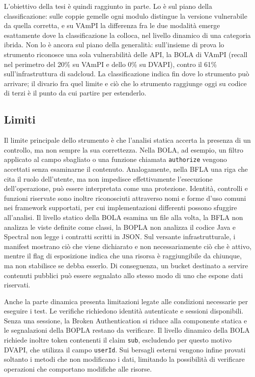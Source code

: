 L'obiettivo della tesi è quindi raggiunto in parte. Lo è sul piano della
classificazione: sulle coppie gemelle ogni modulo distingue la versione
vulnerabile da quella corretta, e su VAmPI la differenza fra le due modalità
emerge esattamente dove la classificazione la colloca, nel livello dinamico di
una categoria ibrida. Non lo è ancora sul piano della generalità: sull'insieme di prova lo strumento
riconosce una sola vulnerabilità delle API, la BOLA di VAmPI (recall nel
perimetro del 20\% su VAmPI e dello 0\% su DVAPI), contro il 61\%
sull'infrastruttura di sadcloud. La classificazione
indica fin dove lo strumento può arrivare; il divario fra quel limite e ciò
che lo strumento raggiunge oggi su codice di terzi è il punto da cui partire
per estenderlo.

\subsection{Limiti}
\label{sec:ris-limiti}

Il limite principale dello strumento è che l'analisi statica accerta la presenza di un controllo, ma non sempre la sua correttezza. Nella BOLA, ad esempio, un filtro applicato al campo sbagliato o una funzione chiamata \texttt{authorize} vengono accettati senza esaminarne il contenuto. Analogamente, nella BFLA una riga che cita il ruolo dell'utente, ma non impedisce effettivamente l'esecuzione dell'operazione, può essere interpretata come una protezione. Identità, controlli e funzioni riservate sono inoltre riconosciuti attraverso nomi e forme d'uso comuni nei framework supportati, per cui implementazioni differenti possono sfuggire all'analisi. Il livello statico della BOLA esamina un file alla volta, la BFLA non analizza le viste definite come classi, la BOPLA non analizza il codice Java e Spectral non legge i contratti scritti in JSON. Sul versante infrastrutturale, i manifest mostrano ciò che viene dichiarato e non necessariamente ciò che è attivo, mentre il flag di esposizione indica che una risorsa è raggiungibile da chiunque, ma non stabilisce se debba esserlo. Di conseguenza, un bucket destinato a servire contenuti pubblici può essere segnalato allo stesso modo di uno che espone dati riservati.

Anche la parte dinamica presenta limitazioni legate alle condizioni necessarie per eseguire i test. Le verifiche richiedono identità autenticate e sessioni disponibili. Senza una sessione, la Broken Authentication si riduce alla componente statica e le segnalazioni della BOPLA restano da verificare. Il livello dinamico della BOLA richiede inoltre token contenenti il claim \texttt{sub}, escludendo per questo motivo DVAPI, che utilizza il campo \texttt{userId}. Sui bersagli esterni vengono infine provati soltanto i metodi che non modificano i dati, limitando la possibilità di verificare operazioni che comportano modifiche alle risorse.


